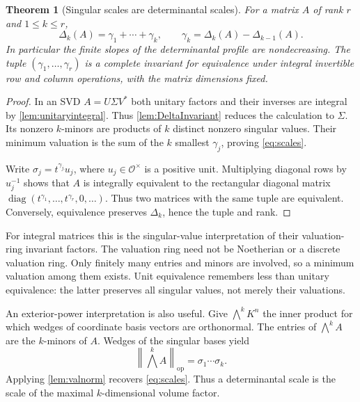 \documentclass[11pt,a4paper]{article}
\numberwithin{equation}{section}
\newtheorem{theorem}{Theorem}[section]
\theoremstyle{definition}
\theoremstyle{remark}
\newcommand{\OO}{\mathcal O}
\newcommand{\diag}{\operatorname{diag}}
\newcommand{\op}{\mathrm{op}}
\newcommand{\norm}[1]{\left\lVert#1\right\rVert}
\begin{document}
\begin{theorem}[Singular scales are determinantal scales]\label{thm:scales}
For a matrix $A$ of rank $r$ and $1\le k\le r$,
\begin{equation}\label{eq:scales}
 \Delta_k(A)=\gamma_1+\cdots+\gamma_k,
 \qquad \gamma_k=\Delta_k(A)-\Delta_{k-1}(A).
\end{equation}
In particular the finite slopes of the determinantal profile are
nondecreasing. The tuple $(\gamma_1,\ldots,\gamma_r)$ is a complete
invariant for equivalence under integral invertible row and column
operations, with the matrix dimensions fixed.
\end{theorem}
\begin{proof}
In an SVD $A=U\Sigma V^*$ both unitary factors and their inverses are
integral by \cref{lem:unitaryintegral}. Thus \cref{lem:DeltaInvariant}
reduces the calculation to $\Sigma$. Its nonzero $k$-minors are products of
$k$ distinct nonzero singular values. Their minimum valuation is the sum of
the $k$ smallest $\gamma_j$, proving \eqref{eq:scales}.

Write $\sigma_j=t^{\gamma_j}u_j$, where $u_j\in\OO^\times$ is a positive
unit. Multiplying diagonal rows by $u_j^{-1}$ shows that $A$ is integrally
equivalent to the rectangular diagonal matrix
$\diag(t^{\gamma_1},\ldots,t^{\gamma_r},0,\ldots)$. Thus two matrices
with the same tuple are equivalent. Conversely, equivalence preserves
$\Delta_k$, hence the tuple and rank.
\end{proof}

For integral matrices this is the singular-value interpretation of their
valuation-ring invariant factors. The valuation ring need not be Noetherian
or a discrete valuation ring. Only finitely many entries and minors are
involved, so a minimum valuation among them exists. Unit equivalence
remembers less than unitary equivalence: the latter preserves all singular
values, not merely their valuations.

An exterior-power interpretation is also useful. Give $\bigwedge^kK^n$
the inner product for which wedges of coordinate basis vectors are
orthonormal. The entries of $\bigwedge^k A$ are the $k$-minors of $A$.
Wedges of the singular bases yield
\[
 \norm{\bigwedge^k A}_{\op}=\sigma_1\cdots\sigma_k.
\]
Applying \cref{lem:valnorm} recovers \eqref{eq:scales}. Thus a determinantal
scale is the scale of the maximal $k$-dimensional volume factor.
\end{document}
